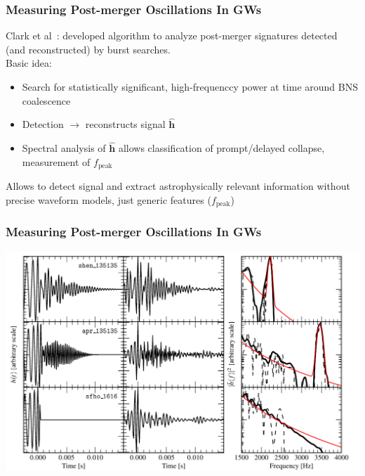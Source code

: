 \documentclass{beamer}
\begin{document}
\begin{frame}
    \frametitle{Measuring Post-merger Oscillations In GWs}
    Clark et al~\cite{clark:14}: developed algorithm to analyze post-merger
    signatures detected (and reconstructed) by burst searches.\\
    Basic idea:
    \begin{itemize}
        \item Search for statistically significant, high-frequenccy power at
            time around BNS coalescence
        \item Detection $\rightarrow$ reconstructs signal $\hat{\mathbf{h}}$
        \item Spectral analysis of $\hat{\mathbf{h}}$ allows classification of
            prompt/delayed collapse, measurement of $f_{\text{peak}}$
    \end{itemize}
    Allows to detect signal and extract astrophysically relevant information
    without precise waveform models, just generic features ($f_{\text{peak}}$)
\end{frame}

\begin{frame}

    \frametitle{Measuring Post-merger Oscillations In GWs}

    \includegraphics[width=\textwidth]{example_reconstruction.pdf}

\end{frame}
\end{document}
